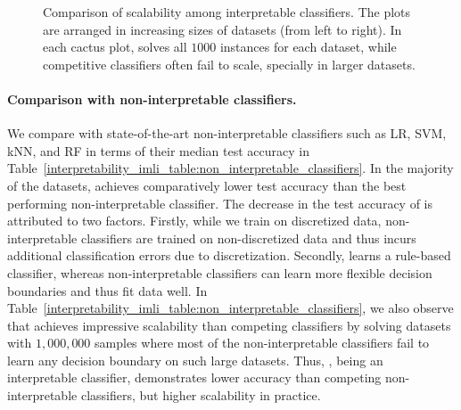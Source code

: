 \begin{figure}[!t]
	
	\caption[Scalability of Interpretable Classifiers]{Comparison of scalability among interpretable classifiers. The plots are arranged in increasing sizes of datasets (from left to right). In each cactus plot, {\imli} solves all $ 1000 $ instances for each dataset, while competitive classifiers often fail to scale, specially in larger datasets.}
	\label{interpretability_imli_fig:interpretable_classifiers}
\end{figure}






\paragraph{Comparison with non-interpretable classifiers.} We compare {\imli} with state-of-the-art non-interpretable classifiers such as LR, SVM, kNN, and RF in terms of their median test accuracy in Table~\ref{interpretability_imli_table:non_interpretable_classifiers}. In the majority of the datasets, {\imli} achieves comparatively lower test accuracy than the best performing non-interpretable classifier. The decrease in the test accuracy of {\imli} is attributed to two factors. Firstly, while we train {\imli} on discretized data, non-interpretable classifiers are trained on non-discretized data and thus {\imli} incurs additional classification errors due to discretization. Secondly, {\imli} learns a rule-based classifier, whereas non-interpretable classifiers can learn more flexible decision boundaries and thus fit data well. In Table~\ref{interpretability_imli_table:non_interpretable_classifiers}, we also observe that {\imli} achieves impressive scalability than competing classifiers by solving datasets with $ 1, 000,000 $  samples where most of the non-interpretable classifiers fail to learn any decision boundary on such large datasets. Thus, {\imli}, being an interpretable classifier, demonstrates lower accuracy than competing non-interpretable classifiers, but higher scalability in practice. 


